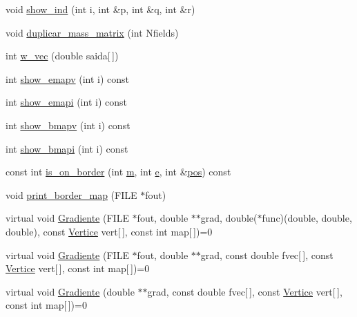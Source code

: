 \begin{DoxyCompactItemize}
\item 
void \hyperlink{classStdel_a20afd536025caf1aad1c4e3f41fcb866}{show\+\_\+ind} (int i, int \&p, int \&q, int \&r)
\item 
void \hyperlink{classStdel_a922b779be1f8f12b7a5535ab529bff64}{duplicar\+\_\+mass\+\_\+matrix} (int Nfields)
\item 
int \hyperlink{classStdel_a395c8d7d7890a9efdea23932fa22b420}{w\+\_\+vec} (double saida\mbox{[}$\,$\mbox{]})
\item 
int \hyperlink{classStdel_ad474ffc52b051ae8317b3fdb583c4c98}{show\+\_\+emapv} (int i) const
\item 
int \hyperlink{classStdel_aca7fb885191a952c013e930521a42213}{show\+\_\+emapi} (int i) const
\item 
int \hyperlink{classStdel_ac8787dabfb1d767b89e39806522c1161}{show\+\_\+bmapv} (int i) const
\item 
int \hyperlink{classStdel_ad3a0646ad7ec2567e46da36285dee331}{show\+\_\+bmapi} (int i) const
\item 
const int \hyperlink{classStdel_abb022f0ad81707e11e3a3091d2d87c46}{is\+\_\+on\+\_\+border} (int \hyperlink{DG__EI__Header_8h_a742204794ea328ba293fe59cec79b990}{m}, int \hyperlink{DG__EI__Header_8h_ab1ff01ebd410ddf016a3c7bbe9d98944}{e}, int \&\hyperlink{DG__EI__Header_8h_a1910d262855b71da353ed0d07a6c7823}{pos}) const
\item 
void \hyperlink{classStdel_a9a0c69dca7564f6ca4aa4f3c9864ea01}{print\+\_\+border\+\_\+map} (F\+I\+LE $\ast$fout)
\item 
virtual void \hyperlink{classStdel_af3e65d1ad0d59ded925a3f5a9d0fb100}{Gradiente} (F\+I\+LE $\ast$fout, double $\ast$$\ast$grad, double($\ast$func)(double, double, double), const \hyperlink{structVertice}{Vertice} vert\mbox{[}$\,$\mbox{]}, const int map\mbox{[}$\,$\mbox{]})=0
\item 
virtual void \hyperlink{classStdel_abf44e457d99e8c559c14cb1f7423da12}{Gradiente} (F\+I\+LE $\ast$fout, double $\ast$$\ast$grad, const double fvec\mbox{[}$\,$\mbox{]}, const \hyperlink{structVertice}{Vertice} vert\mbox{[}$\,$\mbox{]}, const int map\mbox{[}$\,$\mbox{]})=0
\item 
virtual void \hyperlink{classStdel_aec200dfb0b00bebf70a1d845675eeafd}{Gradiente} (double $\ast$$\ast$grad, const double fvec\mbox{[}$\,$\mbox{]}, const \hyperlink{structVertice}{Vertice} vert\mbox{[}$\,$\mbox{]}, const int map\mbox{[}$\,$\mbox{]})=0
\end{DoxyCompactItemize}
